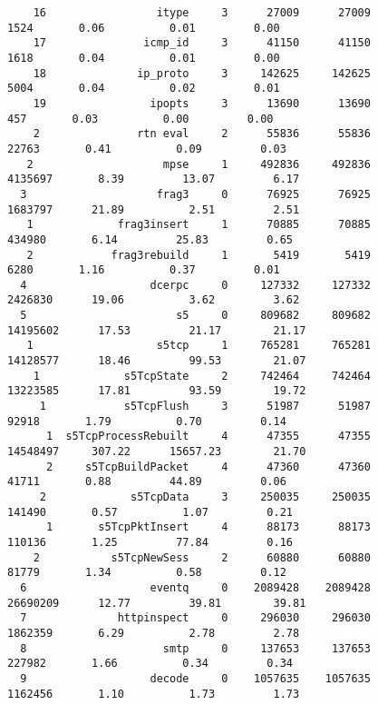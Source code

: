 \documentclass[english]{report}
\begin{document}
\begin{figure}
{\begin{verbatim}
    16                 itype     3      27009      27009                1524       0.06          0.01         0.00
    17               icmp_id     3      41150      41150                1618       0.04          0.01         0.00
    18              ip_proto     3     142625     142625                5004       0.04          0.02         0.01
    19                ipopts     3      13690      13690                 457       0.03          0.00         0.00
    2               rtn eval     2      55836      55836               22763       0.41          0.09         0.03
   2                    mpse     1     492836     492836             4135697       8.39         13.07         6.17
  3                    frag3     0      76925      76925             1683797      21.89          2.51         2.51
   1             frag3insert     1      70885      70885              434980       6.14         25.83         0.65
   2            frag3rebuild     1       5419       5419                6280       1.16          0.37         0.01
  4                   dcerpc     0     127332     127332             2426830      19.06          3.62         3.62
  5                       s5     0     809682     809682            14195602      17.53         21.17        21.17
   1                   s5tcp     1     765281     765281            14128577      18.46         99.53        21.07
    1             s5TcpState     2     742464     742464            13223585      17.81         93.59        19.72
     1            s5TcpFlush     3      51987      51987               92918       1.79          0.70         0.14
      1  s5TcpProcessRebuilt     4      47355      47355            14548497     307.22      15657.23        21.70
      2     s5TcpBuildPacket     4      47360      47360               41711       0.88         44.89         0.06
     2             s5TcpData     3     250035     250035              141490       0.57          1.07         0.21
      1       s5TcpPktInsert     4      88173      88173              110136       1.25         77.84         0.16
    2           s5TcpNewSess     2      60880      60880               81779       1.34          0.58         0.12
  6                   eventq     0    2089428    2089428            26690209      12.77         39.81        39.81
  7              httpinspect     0     296030     296030             1862359       6.29          2.78         2.78
  8                     smtp     0     137653     137653              227982       1.66          0.34         0.34
  9                   decode     0    1057635    1057635             1162456       1.10          1.73         1.73

\end{verbatim}}
\end{figure}
\end{document}
